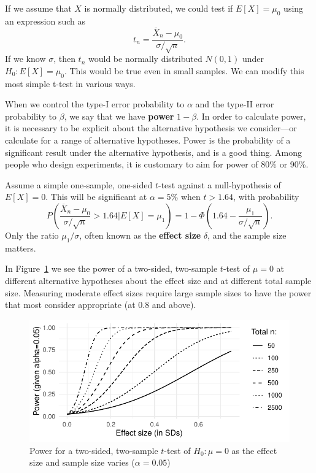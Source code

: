 \documentclass[twoside]{article}
\begin{document}
If we assume that $X$ is normally distributed, we could 
test if $E[X] = \mu_0$ using an expression such as
\[
t_n = \frac{\overline{X}_n - \mu_0}{\sigma/\sqrt{n}}.
\]
If we know $\sigma$, then $t_n$ would be normally distributed $N(0,1)$ under $H_0: E[X]=\mu_0$. 
This would be true even in small samples.
We can modify this most simple t-test in various ways.


When we control the type-I error probability to $\alpha$ and the type-II error probability
to $\beta$, we say that we have \textbf{power} $1-\beta$. 
In order to calculate power, it is necessary to be explicit about the alternative hypothesis 
we consider---or calculate for a range of alternative hypotheses. 
Power is the probability of a significant result under the alternative hypothesis, and is a good thing. 
Among people who design experiments, it is customary to aim for power of 80\% or 90\%.

Assume a simple one-sample, one-sided $t$-test against a null-hypothesis of $E[X]=0$. This will
be significant at $\alpha=5\%$ when $t> 1.64$, with probability
\[
P\left( \frac{\overline{X}_n - \mu_0}{\sigma/\sqrt{n}} > 1.64 | E[X]=\mu_1\right) = 
1 - \Phi\left( 1.64 - \frac{\mu_1}{\sigma/\sqrt{n}}\right).
\]
Only the ratio $\mu_1/\sigma$, often known as the \textbf{effect size}  $\delta$, and the sample
size matters.

In Figure~\ref{fig:power} we see the power of a two-sided, two-sample $t$-test
of $\mu=0$ at different alternative hypotheses about the effect size and at
different total sample size. Measuring moderate effect sizes require large sample
sizes to have the power that most consider appropriate (at 0.8 and above). 

\begin{figure}[tb]
\includegraphics[width=\textwidth]{../graphs/powergraph}

\caption{Power for a two-sided, two-sample $t$-test of $H_0: \mu=0$ as the effect 
size and sample size varies ($\alpha=0.05$)}\label{fig:power}
\end{figure}
\end{document}
